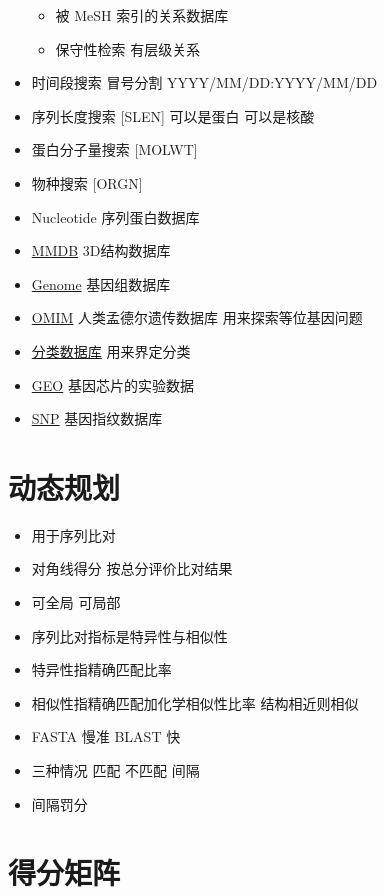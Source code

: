 \documentclass[]{book}
\providecommand{\tightlist}{%
  \setlength{\itemsep}{0pt}\setlength{\parskip}{0pt}}
\begin{document}
\begin{itemize}
  \begin{itemize}
  \tightlist
  \item
    被 MeSH 索引的关系数据库
  \item
    保守性检索 有层级关系
  \end{itemize}
\item
  时间段搜索 冒号分割 YYYY/MM/DD:YYYY/MM/DD
\item
  序列长度搜索 {[}SLEN{]} 可以是蛋白 可以是核酸
\item
  蛋白分子量搜索 {[}MOLWT{]}
\item
  物种搜索 {[}ORGN{]}
\item
  Nucleotide 序列蛋白数据库
\item
  \href{http://www.ncbi.nlm.nih.gov/structure/}{MMDB} 3D结构数据库
\item
  \href{http://www.ncbi.nlm.nih.gov/genome/}{Genome} 基因组数据库
\item
  \href{http://omim.org/}{OMIM} 人类孟德尔遗传数据库 用来探索等位基因问题
\item
  \href{http://www.ncbi.nlm.nih.gov/taxonomy}{分类数据库} 用来界定分类
\item
  \href{http://www.ncbi.nlm.nih.gov/geo/}{GEO} 基因芯片的实验数据
\item
  \href{http://www.ncbi.nlm.nih.gov/snp/}{SNP} 基因指纹数据库
\end{itemize}

\hypertarget{ux52a8ux6001ux89c4ux5212}{%
\section{动态规划}\label{ux52a8ux6001ux89c4ux5212}}

\begin{itemize}
\tightlist
\item
  用于序列比对
\item
  对角线得分 按总分评价比对结果
\item
  可全局 可局部
\item
  序列比对指标是特异性与相似性
\item
  特异性指精确匹配比率
\item
  相似性指精确匹配加化学相似性比率 结构相近则相似
\item
  FASTA 慢准 BLAST 快
\item
  三种情况 匹配 不匹配 间隔
\item
  间隔罚分
\end{itemize}

\hypertarget{ux5f97ux5206ux77e9ux9635}{%
\section{得分矩阵}\label{ux5f97ux5206ux77e9ux9635}}
\end{document}
